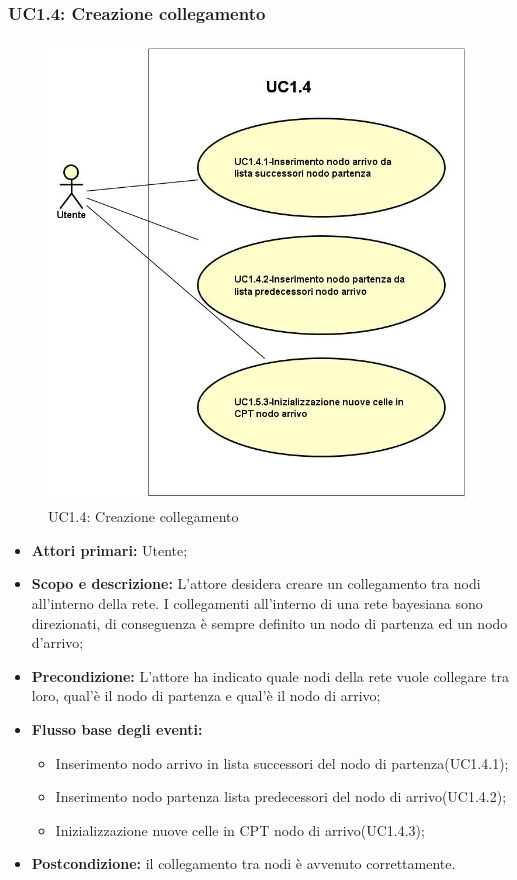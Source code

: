 \subsubsection{UC1.4: Creazione collegamento} 
\begin{figure} [H]
	\centering
	\includegraphics[scale=0.45]{Img/UC1-4} 
	\caption{UC1.4: Creazione collegamento} \label{} 
\end{figure} 
\begin{itemize} 
	\item{\textbf{Attori primari:} Utente;} 
	\item{\textbf{Scopo e descrizione:} L'attore desidera creare un collegamento tra nodi all'interno della rete. I collegamenti all'interno di una rete bayesiana sono direzionati, di conseguenza è sempre definito un nodo di partenza ed un nodo d'arrivo;} 
	\item{\textbf{Precondizione:} L'attore ha indicato quale nodi della rete vuole collegare tra loro, qual'è il nodo di partenza e qual'è il nodo di arrivo;} 
	\item{\textbf{Flusso base degli eventi:} } 
		\begin{itemize} 
			\item{Inserimento nodo arrivo in lista successori del nodo di partenza(UC1.4.1);} 
			\item{Inserimento nodo partenza lista predecessori del nodo di arrivo(UC1.4.2);} 
			\item{Inizializzazione nuove celle in CPT nodo di arrivo(UC1.4.3);} 
		\end{itemize} 
	\item{\textbf{Postcondizione:} il collegamento tra nodi è avvenuto correttamente.} 
\end{itemize} 
